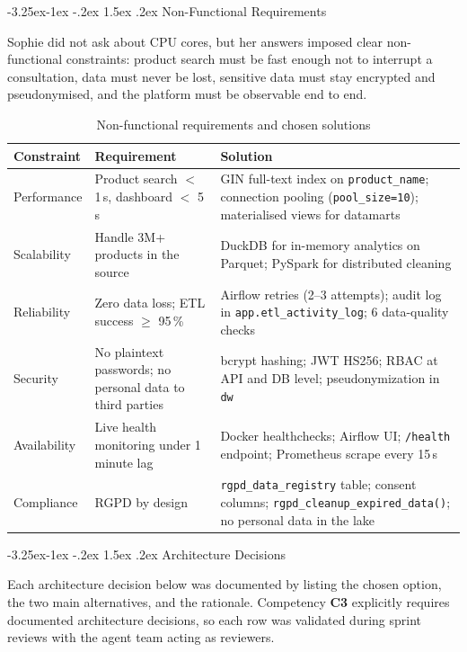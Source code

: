 \documentclass[a4paper,11pt,oneside,openany]{report}
\makeatletter
\renewcommand\subsubsection{\@startsection{subsubsection}{3}{\z@}%
  {-3.25ex\@plus -1ex \@minus -.2ex}%
  {1.5ex \@plus .2ex}%
  {\normalfont\normalsize\bfseries\color{ntblue}}}
\newcommand{\competence}[1]{\textbf{\textcolor{ntgreen}{#1}}}
\newcommand{\rgpd}{RGPD}
\makeatother
\begin{document}
\subsubsection{Non-Functional Requirements}

Sophie did not ask about CPU cores, but her answers imposed clear
non-functional constraints: product search must be fast enough not
to interrupt a consultation, data must never be lost, sensitive
data must stay encrypted and pseudonymised, and the platform must
be observable end to end.

\begin{table}[H]
\centering
\caption{Non-functional requirements and chosen solutions}
\label{tab:nonfunc}
\begin{tabularx}{\textwidth}{L{2.5cm} L{4cm} L{6cm}}
\toprule
\textbf{Constraint} & \textbf{Requirement} & \textbf{Solution} \\
\midrule
Performance & Product search $<$ 1\,s, dashboard $<$ 5\,s & GIN full-text index on \texttt{product\_name}; connection pooling (\texttt{pool\_size=10}); materialised views for datamarts \\
Scalability & Handle 3M+ products in the source & DuckDB for in-memory analytics on Parquet; PySpark for distributed cleaning \\
Reliability & Zero data loss; ETL success $\geq$ 95\,\% & Airflow retries (2--3 attempts); audit log in \texttt{app.etl\_activity\_log}; 6 data-quality checks \\
Security & No plaintext passwords; no personal data to third parties & bcrypt hashing; JWT HS256; RBAC at API and DB level; pseudonymization in \texttt{dw} \\
Availability & Live health monitoring under 1 minute lag & Docker healthchecks; Airflow UI; \texttt{/health} endpoint; Prometheus scrape every 15\,s \\
Compliance & \rgpd{} by design & \texttt{rgpd\_data\_registry} table; consent columns; \texttt{rgpd\_cleanup\_expired\_data()}; no personal data in the lake \\
\bottomrule
\end{tabularx}
\end{table}

\subsubsection{Architecture Decisions}

Each architecture decision below was documented by listing the
chosen option, the two main alternatives, and the rationale.
Competency \competence{C3} explicitly requires documented
architecture decisions, so each row was validated during sprint
reviews with the agent team acting as reviewers.
\end{document}
